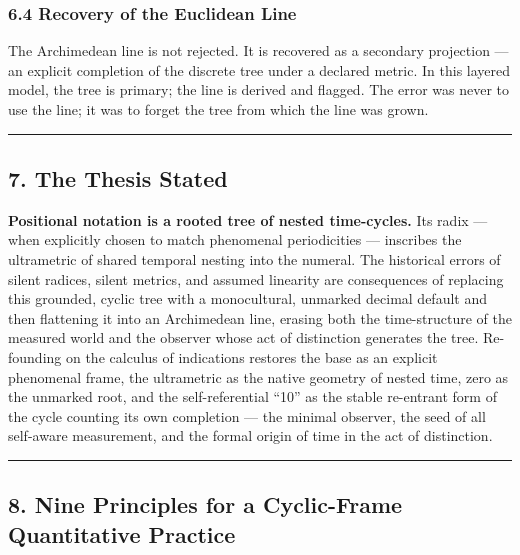 \documentclass[
]{article}
\begin{document}
\subsubsection{6.4 Recovery of the Euclidean
Line}\label{recovery-of-the-euclidean-line}

The Archimedean line is not rejected. It is recovered as a secondary
projection --- an explicit completion of the discrete tree under a
declared metric. In this layered model, the tree is primary; the line is
derived and flagged. The error was never to use the line; it was to
forget the tree from which the line was grown.

\begin{center}\rule{0.5\linewidth}{0.5pt}\end{center}

\subsection{7. The Thesis Stated}\label{the-thesis-stated}

\textbf{Positional notation is a rooted tree of nested time-cycles.} Its
radix --- when explicitly chosen to match phenomenal periodicities ---
inscribes the ultrametric of shared temporal nesting into the numeral.
The historical errors of silent radices, silent metrics, and assumed
linearity are consequences of replacing this grounded, cyclic tree with
a monocultural, unmarked decimal default and then flattening it into an
Archimedean line, erasing both the time-structure of the measured world
and the observer whose act of distinction generates the tree.
Re-founding on the calculus of indications restores the base as an
explicit phenomenal frame, the ultrametric as the native geometry of
nested time, zero as the unmarked root, and the self-referential ``10''
as the stable re-entrant form of the cycle counting its own completion
--- the minimal observer, the seed of all self-aware measurement, and
the formal origin of time in the act of distinction.

\begin{center}\rule{0.5\linewidth}{0.5pt}\end{center}

\subsection{8. Nine Principles for a Cyclic-Frame Quantitative
Practice}\label{nine-principles-for-a-cyclic-frame-quantitative-practice}
\end{document}
